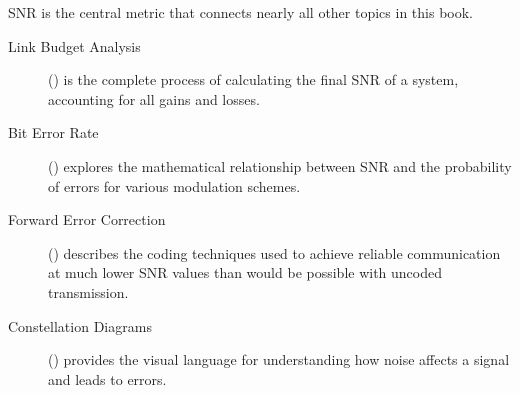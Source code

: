 \begin{importantbox}[title={Further Reading}]
    SNR is the central metric that connects nearly all other topics in this book.
    \begin{description}
        \item[Link Budget Analysis] () is the complete process of calculating the final SNR of a system, accounting for all gains and losses.
        \item[Bit Error Rate] () explores the mathematical relationship between SNR and the probability of errors for various modulation schemes.
        \item[Forward Error Correction] () describes the coding techniques used to achieve reliable communication at much lower SNR values than would be possible with uncoded transmission.
        \item[Constellation Diagrams] () provides the visual language for understanding how noise affects a signal and leads to errors.
    \end{description}
\end{importantbox}